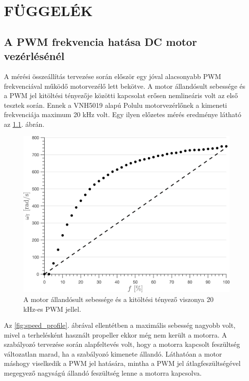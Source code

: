 \part*{FÜGGELÉK}

\chapter{A PWM frekvencia hatása DC motor vezérlésénél}\label{chap:effects_of_pwm_frequency}
A mérési összeállítás tervezése során először egy jóval alacsonyabb PWM frekvenciával működő 
motorvezélő lett bekötve. A motor állandósult sebessége és a PWM jel kitöltési tényezője közötti kapcsolat 
erősen nemlineáris volt az első tesztek során. Ennek a VNH5019 alapú Polulu motorvezérlőnek a kimeneti frekvenciája 
maximum 20 kHz volt. Egy ilyen előzetes mérés eredménye látható az \ref{fig:motor_response_20khz}. ábrán. 
\begin{figure}[H]
    \begin{center}
    \includegraphics[width=14cm]{images/motor_pwm_response20.png}
    \caption{A motor állandósult sebessége és a kitöltési tényező viszonya 20 kHz-es PWM jellel.}\label{fig:motor_response_20khz}
    \end{center}
\end{figure}
Az \ref{fig:speed_profile}. ábrával ellentétben a maximális sebesség nagyobb volt, mivel a 
terhelésként használt propeller ekkor még nem került a motorra. A szabályozó tervezése során alapfeltevés volt, hogy 
a motorra kapcsolt feszültség változatlan marad, ha a szabályozó kimenete állandó. Láthatóan a motor máshogy viselkedik 
a PWM jel hatására, mintha a PWM jel átlagfeszültségével megegyező nagyságú állandó feszültség lenne a motorra kapcsolva.
